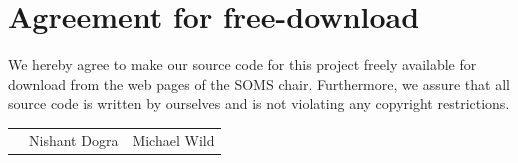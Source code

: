 \documentclass[11pt]{article}
\begin{document}

\newpage


\newpage
\section*{Agreement for free-download}
\bigskip


\bigskip


\large We hereby agree to make our source code for this project freely available for download from the web pages of the SOMS chair. Furthermore, we assure that all source code is written by ourselves and is not violating any copyright restrictions.

\begin{center}

\bigskip




\bigskip


\begin{tabular}{@{}p{3.3cm}@{}p{6cm}@{}@{}p{6cm}@{}}
\begin{minipage}{3cm}

\end{minipage}
&
\begin{minipage}{6cm}
\vspace{2mm} \large Nishant Dogra

 \vspace{\baselineskip}

\end{minipage}
&
\begin{minipage}{6cm}

\large Michael Wild

\end{minipage}
\end{tabular}


\end{center}
\newpage







\tableofcontents

\newpage
\end{document}
